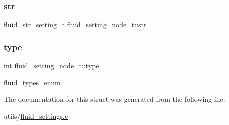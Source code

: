 \mbox{\label{structfluid__setting__node__t_aa21d3a8f36b2d8ad7df4179d416dcba1}} 
\subsubsection{\texorpdfstring{str}{str}}
{\footnotesize\ttfamily \hyperlink{structfluid__str__setting__t}{fluid\+\_\+str\+\_\+setting\+\_\+t} fluid\+\_\+setting\+\_\+node\+\_\+t\+::str}

\mbox{\label{structfluid__setting__node__t_ab4c71693974474f8f96a3dd44fd63882}} 
\subsubsection{\texorpdfstring{type}{type}}
{\footnotesize\ttfamily int fluid\+\_\+setting\+\_\+node\+\_\+t\+::type}

fluid\+\_\+types\+\_\+enum 

The documentation for this struct was generated from the following file\+:\begin{DoxyCompactItemize}
\item 
utils/\hyperlink{fluid__settings_8c}{fluid\+\_\+settings.\+c}\end{DoxyCompactItemize}

